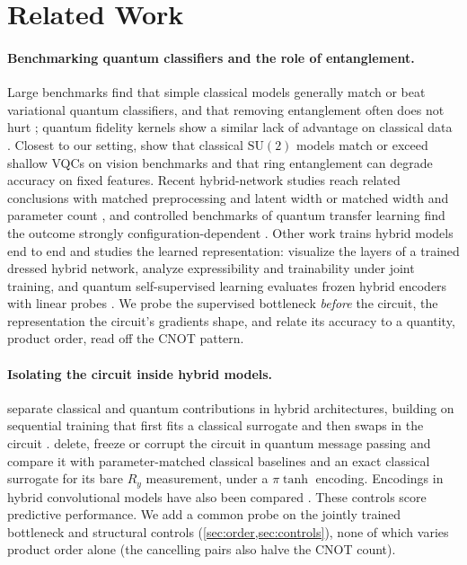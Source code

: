 \section{Related Work}
\label{sec:related}

\paragraph{Benchmarking quantum classifiers and the role of entanglement.}
Large benchmarks find that simple classical models generally match or beat variational
quantum classifiers, and that removing entanglement often does not hurt
\citep{bowles2024}; quantum fidelity kernels show a similar lack of advantage on classical
data \citep{slattery2022}. Closest to our setting, \citet{fulton2026} show that classical
$\mathrm{SU}(2)$ models match or exceed shallow VQCs on vision benchmarks and that ring
entanglement can degrade accuracy on fixed features. Recent hybrid-network studies reach
related conclusions with matched preprocessing and latent width \citep{freinberger2026} or
matched width and parameter count \citep{park2026}, and controlled benchmarks of quantum transfer learning find
the outcome strongly configuration-dependent \citep{innan2026}. Other work trains hybrid models end to end and
studies the learned representation: \citet{bowles2024} visualize the layers of a trained
dressed hybrid network, \citet{kashif2026} analyze expressibility and
trainability under joint training, and quantum self-supervised learning evaluates frozen
hybrid encoders with linear probes \citep{jaderberg2021,edwards2026}. We probe the
supervised bottleneck \emph{before} the circuit, the representation the circuit's
gradients shape, and relate its accuracy to a quantity, product order, read off the CNOT
pattern.

\paragraph{Isolating the circuit inside hybrid models.}
\citet{kolle2024} separate classical and quantum contributions in hybrid architectures,
building on sequential training that first fits a classical surrogate and then swaps in the
circuit \citep{altmann2023}. \citet{elhag2026} delete, freeze or corrupt the circuit in
quantum message passing and compare it with parameter-matched classical baselines and an exact
classical surrogate for its bare $R_y$ measurement, under a $\pi\tanh$ encoding. Encodings in
hybrid convolutional models have also been compared \citep{monnet2024}. These controls score
predictive performance. We add a common probe on the jointly trained bottleneck and structural
controls (\cref{sec:order,sec:controls}), none of which varies product order alone (the
cancelling pairs also halve the CNOT count).

